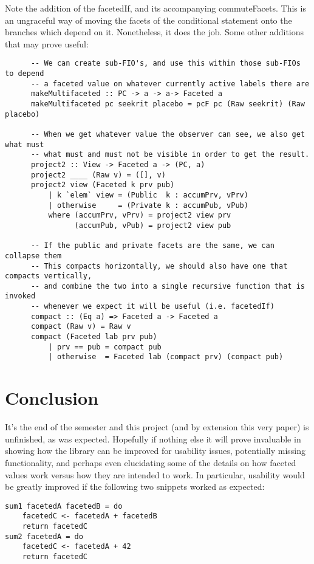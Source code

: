 \documentclass[12pt,a4paper]{article}
\begin{document}
	Note the addition of the facetedIf, and its accompanying commuteFacets. This is an ungraceful way of moving the facets of the conditional statement onto the branches which depend on it. Nonetheless, it does the job. Some other additions that may prove useful:
	
 \begin{lstlisting}	  
	  -- We can create sub-FIO's, and use this within those sub-FIOs to depend
	  -- a faceted value on whatever currently active labels there are
	  makeMultifaceted :: PC -> a -> a-> Faceted a
	  makeMultifaceted pc seekrit placebo = pcF pc (Raw seekrit) (Raw placebo)
	  
	  -- When we get whatever value the observer can see, we also get what must
	  -- what must and must not be visible in order to get the result.
	  project2 :: View -> Faceted a -> (PC, a)
	  project2 ____ (Raw v) = ([], v)
	  project2 view (Faceted k prv pub)
		  | k `elem` view = (Public  k : accumPrv, vPrv)
		  | otherwise     = (Private k : accumPub, vPub)
		  where (accumPrv, vPrv) = project2 view prv
				(accumPub, vPub) = project2 view pub
	  
	  -- If the public and private facets are the same, we can collapse them 
	  -- This compacts horizontally, we should also have one that compacts vertically,
	  -- and combine the two into a single recursive function that is invoked
	  -- whenever we expect it will be useful (i.e. facetedIf)
	  compact :: (Eq a) => Faceted a -> Faceted a
	  compact (Raw v) = Raw v
	  compact (Faceted lab prv pub)
		  | prv == pub = compact pub
		  | otherwise  = Faceted lab (compact prv) (compact pub)
 \end{lstlisting}
 
 	\section{Conclusion}
 	It's the end of the semester and this project (and by extension this very paper) is unfinished, as was expected. Hopefully if nothing else it will prove invaluable in showing how the library can be improved for usability issues, potentially missing functionality, and perhaps even elucidating some of the details on how faceted values work versus how they are intended to work. In particular, usability would be greatly improved if the following two snippets worked as expected:
 	
 	 \begin{lstlisting}	 
sum1 facetedA facetedB = do
 	facetedC <- facetedA + facetedB
 	return facetedC
sum2 facetedA = do
	facetedC <- facetedA + 42
	return facetedC
	  \end{lstlisting}
	  
\end{document}
